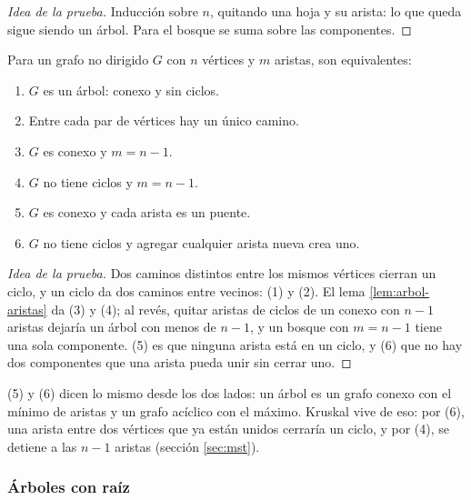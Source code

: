 \documentclass[11pt,letterpaper]{article}
\begin{document}
\begin{proof}[Idea de la prueba]
  Inducción sobre $n$, quitando una hoja y su arista: lo que queda
  sigue siendo un árbol. Para el bosque se suma sobre las componentes.
\end{proof}

\begin{teorema}
  \label{teo:arbol-caracterizaciones}
  Para un grafo no dirigido $G$ con $n$ vértices y $m$ aristas, son
  equivalentes:
  \begin{enumerate}[label=(\arabic*), itemsep=0pt, parsep=0pt]
    \item $G$ es un árbol: conexo y sin ciclos.
    \item Entre cada par de vértices hay un único camino.
    \item $G$ es conexo y $m = n - 1$.
    \item $G$ no tiene ciclos y $m = n - 1$.
    \item $G$ es conexo y cada arista es un puente.
    \item $G$ no tiene ciclos y agregar cualquier arista nueva crea
          uno.
  \end{enumerate}
\end{teorema}

\begin{proof}[Idea de la prueba]
  Dos caminos distintos entre los mismos vértices cierran un ciclo, y
  un ciclo da dos caminos entre vecinos: (1) y (2). El lema
  \ref{lem:arbol-aristas} da (3) y (4); al revés, quitar aristas de
  ciclos de un conexo con $n - 1$ aristas dejaría un árbol con menos
  de $n - 1$, y un bosque con $m = n - 1$ tiene una sola componente.
  (5) es que ninguna arista está en un ciclo, y (6) que no hay dos
  componentes que una arista pueda unir sin cerrar uno.
\end{proof}

(5) y (6) dicen lo mismo desde los dos lados: un árbol es un grafo
conexo con el mínimo de aristas y un grafo acíclico con el máximo.
Kruskal vive de eso: por (6), una arista entre dos vértices que ya
están unidos cerraría un ciclo, y por (4), se detiene a las $n - 1$
aristas (sección \ref{sec:mst}).

\subsubsection*{Árboles con raíz}
\end{document}
